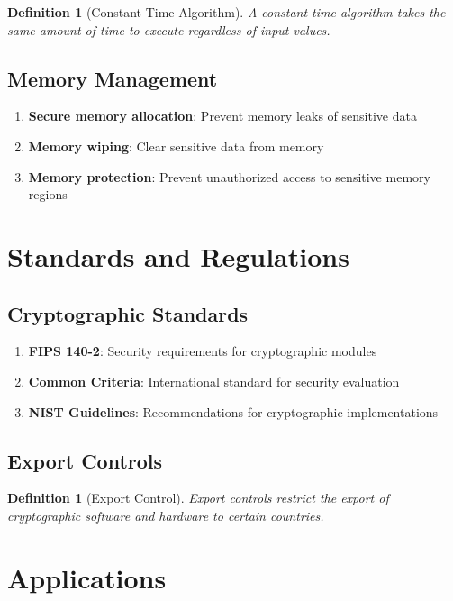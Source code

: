 \documentclass[11pt,a4paper]{article}
\newtheorem{definition}[theorem]{Definition}
\begin{document}
\begin{definition}[Constant-Time Algorithm]
A constant-time algorithm takes the same amount of time to execute regardless of input values.
\end{definition}

\subsection{Memory Management}

\begin{enumerate}
\item \textbf{Secure memory allocation}: Prevent memory leaks of sensitive data
\item \textbf{Memory wiping}: Clear sensitive data from memory
\item \textbf{Memory protection}: Prevent unauthorized access to sensitive memory regions
\end{enumerate}

\section{Standards and Regulations}

\subsection{Cryptographic Standards}

\begin{enumerate}
\item \textbf{FIPS 140-2}: Security requirements for cryptographic modules
\item \textbf{Common Criteria}: International standard for security evaluation
\item \textbf{NIST Guidelines}: Recommendations for cryptographic implementations
\end{enumerate}

\subsection{Export Controls}

\begin{definition}[Export Control]
Export controls restrict the export of cryptographic software and hardware to certain countries.
\end{definition}

\section{Applications}
\end{document}

